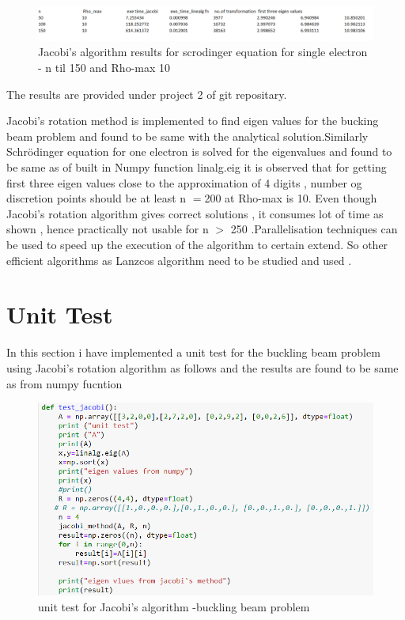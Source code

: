 \documentclass{article}
\newcommand{\SL}{Schr\"{o}dinger }
\begin{document}
\begin{figure}[H]
 	 \includegraphics[width=\linewidth]{timerhomax10n150.png}
	\caption{Jacobi's algorithm results for scrodinger equation for single electron - n til 150 and Rho-max 10}
  \label{fig:schro}
\end{figure}

The results are provided under project 2 of git repositary.

Jacobi's rotation method is implemented to find eigen values for the bucking beam problem and found to be same with the analytical solution.Similarly  \SL equation for one electron is solved for the eigenvalues and found to be same as of built in Numpy function linalg.eig
it is observed that for getting first three eigen values close to the approximation of 4 digits , number og discretion points should be at least n $=$200 at Rho-max is 10. 
Even though Jacobi's rotation algorithm gives correct solutions , it consumes lot of time as shown , hence practically not usable for n $>$ 250 .Parallelisation techniques can be used to speed up the execution of the algorithm to certain extend.
So other efficient algorithms as Lanzcos algorithm need to be studied and used . 

\section{Unit Test}
In this section i have implemented a unit test for the buckling beam problem using Jacobi's rotation algorithm as follows and the results are found to be same as from numpy fucntion

\begin{figure}[H]
 	 \includegraphics[width=\linewidth]{unittestbuckbeam.png}
	\caption{ unit test for Jacobi's algorithm -buckling beam problem}
  \label{fig:unit test  }
\end{figure}
\end{document}
